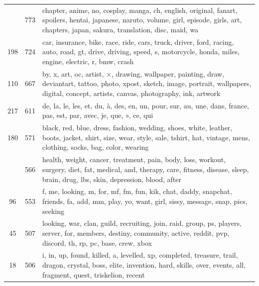 \documentclass[11pt,a4paper,twoside]{article}
\let\oldpb\printbibliography
\renewcommand{\printbibliography}{\oldpb[heading=bibintoc]}
\begin{document}
\begin{longtable}[t]{cr >{\raggedright\arraybackslash}p{\textwidth}}
\addlinespace
251 & 773 & chapter, anime, no, cosplay, manga, ch, english, original, fanart, spoilers, hentai, japanese, naruto, volume, girl, episode, girls, art, chapters, japan, sakura, translation, disc, maid, wa\\
198 & 724 & car, insurance, bike, race, ride, cars, truck, driver, ford, racing, auto, road, gt, drive, driving, speed, s, motorcycle, honda, miles, engine, electric, r, bmw, crash\\
110 & 667 & by, x, art, oc, artist, ×, drawing, wallpaper, painting, draw, deviantart, tattoo, photo, xpost, sketch, image, portrait, wallpapers, digital, concept, artists, canvas, photography, ink, artwork\\
217 & 611 & de, la, le, les, et, du, à, des, en, un, pour, sur, au, une, dans, france, pas, est, par, avec, je, que, », ce, qui\\
180 & 571 & black, red, blue, dress, fashion, wedding, shoes, white, leather, boots, jacket, shirt, size, wear, style, sale, tshirt, hat, vintage, mens, clothing, socks, bag, color, wearing\\
\addlinespace
195 & 566 & health, weight, cancer, treatment, pain, body, loss, workout, surgery, diet, fat, medical, and, therapy, care, fitness, disease, sleep, brain, drug, lbs, skin, depression, blood, after\\
96 & 553 & f, me, looking, m, for, mf, fm, fun, kik, chat, daddy, snapchat, friends, fa, add, mm, play, yo, want, girl, sissy, message, snap, pics, seeking\\
45 & 507 & looking, war, clan, guild, recruiting, join, raid, group, ps, players, server, for, members, destiny, community, active, reddit, pvp, discord, th, rp, pc, base, crew, xbox\\
18 & 506 & i, in, up, found, killed, a, levelled, xp, completed, treasure, trail, dragon, crystal, boss, elite, invention, hard, skills, over, events, all, fragment, quest, triskelion, recent\\
\bottomrule
\end{longtable}

\cleardoublepage

\printbibliography
\end{document}
